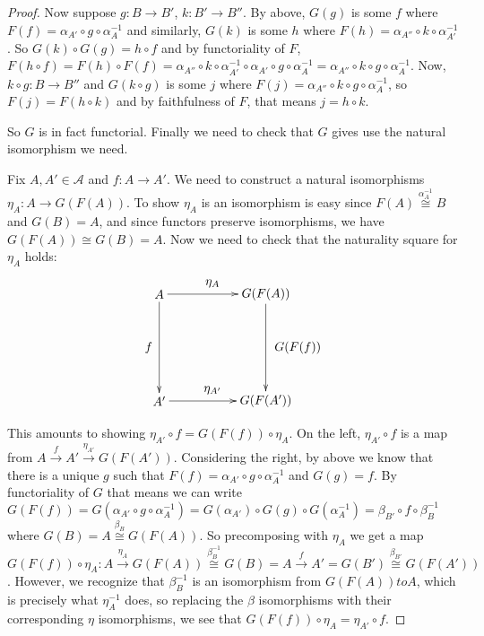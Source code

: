 \documentclass[11pt]{article}
\theoremstyle{definition}
\theoremstyle{plain}
\theoremstyle{plain}
\theoremstyle{plain}
\begin{document}
\begin{proof}
Now suppose $g:B \to B'$, $k:B' \to B''$. By above, $G(g)$ is some $f$ where $F(f) = \alpha_{A'} \circ g \circ \alpha_{A}^{-1}$ and similarly, $G(k)$ is some $h$ where $F(h) = \alpha_{A''} \circ k \circ \alpha_{A'}^{-1}$. So $G(k) \circ G(g) = h \circ f$ and by functoriality of $F$, $F(h \circ f) = F(h) \circ F(f)= \alpha_{A''} \circ k \circ \alpha_{A'}^{-1} \circ \alpha_{A'} \circ g \circ \alpha_{A}^{-1} = \alpha_{A''} \circ k \circ g \circ \alpha_{A}^{-1}$. Now, $k \circ g: B \to B''$ and $G(k \circ g)$ is some $j$ where $F(j)=\alpha_{A''} \circ k \circ g \circ \alpha_{A}^{-1}$, so $F(j)=F(h \circ k)$ and by faithfulness of $F$, that means $j=h \circ k$.

So $G$ is in fact functorial. Finally we need to check that $G$ gives use the natural isomorphism we need.

Fix $A,A'\in\mathscr{A}$ and $f:A \to A'$. We need to construct a natural isomorphisms $\eta_{A}:A \to G(F(A))$. To show $\eta_{A}$ is an isomorphism is easy since $F(A) \overset{\alpha_{A}^{-1}}{\cong}B$ and $G(B)=A$, and since functors preserve isomorphisms, we have $G(F(A)) \cong G(B) = A$. Now we need to check that the naturality square for $\eta_{A}$ holds:

\begin{equation*}
\begin{xy}
(0,0)*+{A}="a"; (30,0)*+{G(F(A))}="gfa";%
(0,-30)*+{A'}="ap"; (30,-30)*+{G(F(A'))}="gfap";
{\ar "a"; "gfa"}?*!/_3mm/{\eta_{A}};
{\ar "a"; "ap"}?*!/^3mm/{f};
{\ar "ap"; "gfap"}?*!/_3mm/{\eta_{A'}};
{\ar "gfa";"gfap"}?*!/_9mm/{G(F(f))};
\end{xy}
\end{equation*}

This amounts to showing $\eta_{A'} \circ f = G(F(f)) \circ \eta_{A}$. On the left, $\eta_{A'} \circ f$ is a map from $A \overset{f}{\rightarrow} A' \overset{\eta_{A'}}{\rightarrow} G(F(A'))$. Considering the right, by above we know that there is a unique $g$ such that $F(f)=\alpha_{A'} \circ g \circ \alpha_{A}^{-1}$ and $G(g)=f$. By functoriality of $G$ that means we can write $G(F(f))=G(\alpha_{A'} \circ g \circ \alpha_{A}^{-1}) = G(\alpha_{A'}) \circ G(g) \circ G(\alpha_{A}^{-1}) = \beta_{B'} \circ f \circ \beta_{B}^{-1}$ where $G(B)=A \overset{\beta_{B}}{\cong} G(F(A))$. So precomposing with $\eta_{A}$ we get a map $G(F(f)) \circ \eta_{A}: A \overset{\eta_{A}}{\rightarrow} G(F(A)) \overset{\beta_{B}^{-1}}{\cong} G(B) = A \overset{f}{\rightarrow} A' = G(B') \overset{\beta_{B'}}{\cong} G(F(A'))$. However, we recognize that $\beta_{B}^{-1}$ is an isomorphism from $G(F(A)) to A$, which is precisely what $\eta_{A}^{-1}$ does, so replacing the $\beta$ isomorphisms with their corresponding $\eta$ isomorphisms, we see that $G(F(f)) \circ \eta_{A} = \eta_{A'} \circ f$.


\end{proof}
\end{document}
